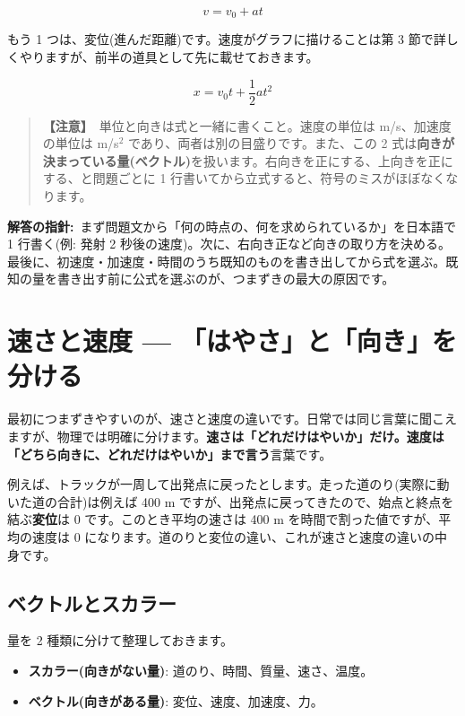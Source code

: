 \documentclass{article}
\begin{document}
\[ v = v_{0} + at \]

もう 1 つは、変位(進んだ距離)です。速度がグラフに描けることは第 3 節で詳しくやりますが、前半の道具として先に載せておきます。

\[ x = v_{0} t + \frac{1}{2} a t^{2} \]

\begin{quote}
\textbf{【注意】}\ 単位と向きは式と一緒に書くこと。速度の単位は m/s、加速度の単位は m/s\(^{2}\) であり、両者は別の目盛りです。また、この 2 式は\textbf{向きが決まっている量(ベクトル)}を扱います。右向きを正にする、上向きを正にする、と問題ごとに 1 行書いてから立式すると、符号のミスがほぼなくなります。
\end{quote}

\textbf{解答の指針:}\ まず問題文から「何の時点の、何を求められているか」を日本語で 1 行書く(例: 発射 2 秒後の速度)。次に、右向き正など向きの取り方を決める。最後に、初速度・加速度・時間のうち既知のものを書き出してから式を選ぶ。既知の量を書き出す前に公式を選ぶのが、つまずきの最大の原因です。

\section{速さと速度 — 「はやさ」と「向き」を分ける}

最初につまずきやすいのが、速さと速度の違いです。日常では同じ言葉に聞こえますが、物理では明確に分けます。\textbf{速さは「どれだけはやいか」だけ。速度は「どちら向きに、どれだけはやいか」まで言う}言葉です。

例えば、トラックが一周して出発点に戻ったとします。走った道のり(実際に動いた道の合計)は例えば 400 m ですが、出発点に戻ってきたので、始点と終点を結ぶ\textbf{変位}は 0 です。このとき平均の速さは 400 m を時間で割った値ですが、平均の速度は 0 になります。道のりと変位の違い、これが速さと速度の違いの中身です。

\subsection{ベクトルとスカラー}

量を 2 種類に分けて整理しておきます。

\begin{itemize}
\item \textbf{スカラー(向きがない量)}: 道のり、時間、質量、速さ、温度。
\item \textbf{ベクトル(向きがある量)}: 変位、速度、加速度、力。
\end{itemize}
\end{document}

